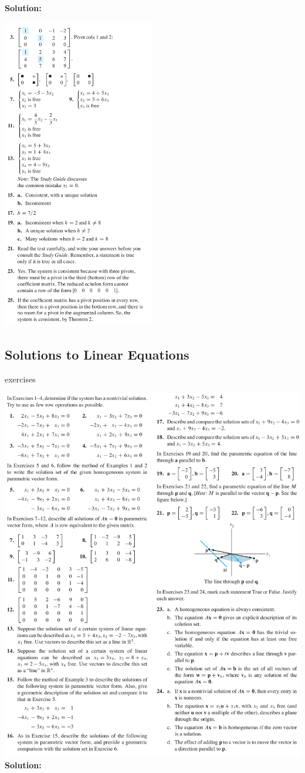 \documentclass[a4paper,11pt,reqno]{amsart}
\numberwithin{equation}{section}
\begin{document}
\newpage
\textbf{Solution:}

\includegraphics[width=0.5\textwidth]{exercises/rr_ans.png}

\newpage
\subsection{Solutions to Linear Equations} 
exercises

\includegraphics[width=\textwidth]{exercises/sle.png}
\newpage
\textbf{Solution:}
\end{document}
